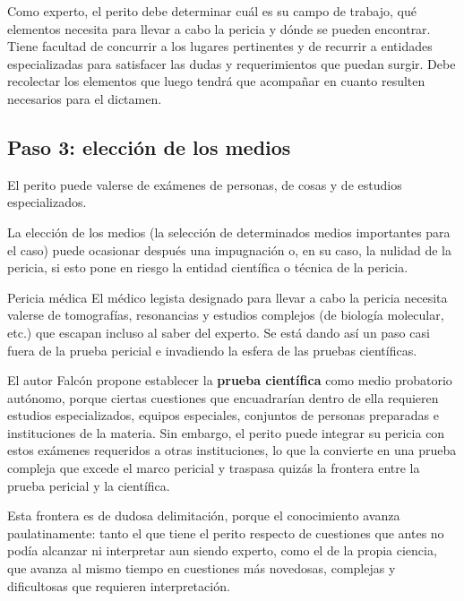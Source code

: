 \documentclass[12pt,oneside]{book}
\begin{document}
Como experto, el perito debe determinar cuál es su campo de trabajo, qué elementos necesita para llevar a cabo la pericia y dónde se pueden encontrar. Tiene facultad de concurrir a los lugares pertinentes y de recurrir a entidades especializadas para satisfacer las dudas y requerimientos que puedan surgir. Debe recolectar los elementos que luego tendrá que acompañar en cuanto resulten necesarios para el dictamen.

\subsection{Paso 3: elección de los medios}

El perito puede valerse de exámenes de personas, de cosas y de estudios especializados.

\begin{important}
La elección de los medios (la selección de determinados medios importantes para el caso) puede ocasionar después una impugnación o, en su caso, la nulidad de la pericia, si esto pone en riesgo la entidad científica o técnica de la pericia.
\end{important}

\begin{example}{Pericia médica}
El médico legista designado para llevar a cabo la pericia necesita valerse de tomografías, resonancias y estudios complejos (de biología molecular, etc.) que escapan incluso al saber del experto. Se está dando así un paso casi fuera de la prueba pericial e invadiendo la esfera de las pruebas científicas.
\end{example}

El autor Falcón propone establecer la \textbf{prueba científica} como medio probatorio autónomo, porque ciertas cuestiones que encuadrarían dentro de ella requieren estudios especializados, equipos especiales, conjuntos de personas preparadas e instituciones de la materia. Sin embargo, el perito puede integrar su pericia con estos exámenes requeridos a otras instituciones, lo que la convierte en una prueba compleja que excede el marco pericial y traspasa quizás la frontera entre la prueba pericial y la científica.

Esta frontera es de dudosa delimitación, porque el conocimiento avanza paulatinamente: tanto el que tiene el perito respecto de cuestiones que antes no podía alcanzar ni interpretar aun siendo experto, como el de la propia ciencia, que avanza al mismo tiempo en cuestiones más novedosas, complejas y dificultosas que requieren interpretación.
\end{document}
